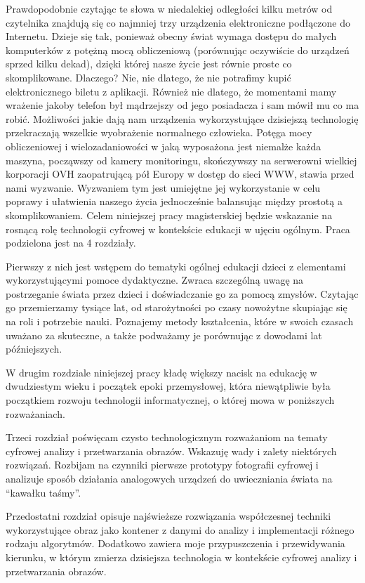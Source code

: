 \documentclass{article}
\begin{document}
\par
Prawdopodobnie czytając te słowa w niedalekiej odległości kilku metrów od czytelnika znajdują się co najmniej trzy urządzenia elektroniczne podłączone do Internetu. Dzieje się tak, ponieważ obecny świat wymaga dostępu do małych komputerków z potężną mocą obliczeniową (porównując oczywiście do urządzeń sprzed kilku dekad), dzięki której nasze życie jest równie proste co skomplikowane. Dlaczego? Nie, nie dlatego, że nie potrafimy kupić elektronicznego biletu z aplikacji. Również nie dlatego, że momentami mamy wrażenie jakoby telefon był mądrzejszy od jego posiadacza i sam mówił mu co ma robić. Możliwości jakie dają nam urządzenia wykorzystujące dzisiejszą technologię przekraczają wszelkie wyobrażenie normalnego człowieka. Potęga mocy obliczeniowej i wielozadaniowości w jaką wyposażona jest niemalże każda maszyna, począwszy od kamery monitoringu, skończywszy na serwerowni wielkiej korporacji OVH zaopatrującą pół Europy w dostęp do sieci WWW, stawia przed nami wyzwanie. Wyzwaniem tym jest umiejętne jej wykorzystanie w celu poprawy i ułatwienia naszego życia jednocześnie balansując między prostotą a skomplikowaniem.
Celem niniejszej pracy magisterskiej będzie wskazanie na rosnącą rolę technologii cyfrowej w kontekście edukacji w ujęciu ogólnym. Praca podzielona jest na 4 rozdziały.
\par 
Pierwszy z nich jest wstępem do tematyki ogólnej edukacji dzieci z elementami wykorzystującymi pomoce dydaktyczne. Zwraca szczególną uwagę na postrzeganie świata przez dzieci i doświadczanie go za pomocą zmysłów. Czytając go przemierzamy tysiące lat, od starożytności po czasy nowożytne skupiając się na roli i potrzebie nauki. Poznajemy metody kształcenia, które w swoich czasach uważano za skuteczne, a także podważamy je porównując z dowodami lat późniejszych.
\par
W drugim rozdziale niniejszej pracy kładę większy nacisk na edukację w dwudziestym wieku i początek epoki przemysłowej, która niewątpliwie była początkiem rozwoju technologii informatycznej, o której mowa w poniższych rozważaniach.
\par
Trzeci rozdział poświęcam czysto technologicznym rozważaniom na tematy cyfrowej analizy i przetwarzania obrazów. Wskazuję wady i zalety niektórych rozwiązań. Rozbijam na czynniki pierwsze prototypy fotografii cyfrowej i analizuje sposób działania analogowych urządzeń do uwieczniania świata na “kawałku taśmy”.
\par
Przedostatni rozdział opisuje najświeższe rozwiązania współczesnej techniki wykorzystujące obraz jako kontener z danymi do analizy i implementacji różnego rodzaju algorytmów. Dodatkowo zawiera moje przypuszczenia i przewidywania kierunku, w którym zmierza dzisiejsza technologia w kontekście cyfrowej analizy i przetwarzania obrazów.
\end{document}
